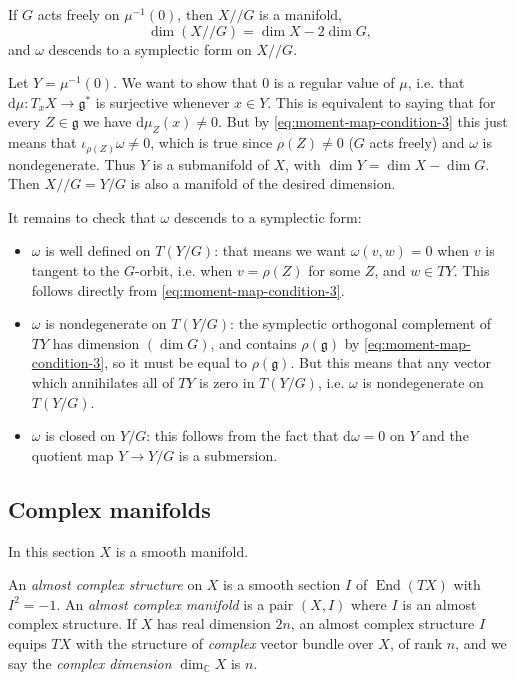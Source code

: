 \documentclass[12pt,letterpaper,reqno]{article}
\numberwithin{equation}{section}
\newcommand{\fg}{{\mathfrak g}}
\newcommand{\C}{\ensuremath{\mathbb C}}
\newcommand{\kq}{/\!\!/}
\newcommand{\de}{\mathrm{d}}
\newcommand{\ti}[1]{\textit{#1}}
\DeclareMathOperator{\End}{End}
\begin{document}
\begin{prop}
If $G$ acts freely
on $\mu^{-1}(0)$, then $X \kq G$ is a manifold,
\begin{equation}
  \dim (X \kq G) = \dim X - 2 \dim G,
\end{equation}
and $\omega$ descends to a symplectic form on $X \kq G$.
\end{prop}
\begin{pf}
Let $Y = \mu^{-1}(0)$.
We want to show that $0$ is a regular value of $\mu$,
i.e. that $\de \mu: T_x X \to \fg^*$ is surjective
whenever $x \in Y$. This 
is equivalent to saying that for every $Z \in \fg$
we have $\de \mu_Z(x) \neq 0$.
But by \eqref{eq:moment-map-condition-3} this just means
that $\iota_{\rho(Z)} \omega \neq 0$,
which is true since $\rho(Z) \neq 0$ ($G$ acts freely)
and $\omega$ is nondegenerate.
Thus $Y$ is a submanifold of $X$,
with $\dim Y = \dim X - \dim G$.
Then $X \kq G = Y / G$ is also a manifold of the desired 
dimension.

It remains to check that $\omega$ descends to a
symplectic form: 
\begin{itemize} 
\item $\omega$ is well defined
on $T(Y/G)$: that means we want $\omega(v,w) = 0$
when $v$ is tangent to the $G$-orbit, i.e. when $v = \rho(Z)$
for some $Z$, and $w \in TY$. This follows directly from
\eqref{eq:moment-map-condition-3}.
\item $\omega$ is nondegenerate on $T(Y/G)$:
the symplectic orthogonal complement of $TY$ has dimension
$(\dim G)$, and contains $\rho(\fg)$ by
\eqref{eq:moment-map-condition-3}, so it must be equal
to $\rho(\fg)$. But this means that any vector which
annihilates all of $TY$ is zero in $T(Y/G)$, i.e.
$\omega$ is nondegenerate on $T(Y/G)$.
\item $\omega$ is closed on $Y/G$: this follows 
from the fact that $\de \omega = 0$ on $Y$ and the
quotient map $Y \to Y/G$ is a submersion.
\end{itemize}
\end{pf}


\subsection{Complex manifolds} 
In this section $X$ is a smooth manifold.

\begin{defn}
An \ti{almost complex structure} on $X$ is a smooth section $I$ of $\End(TX)$ with $I^2 = -1$. An \ti{almost complex manifold} is a pair $(X,I)$ where $I$ is an almost complex structure.
If $X$ has real dimension $2n$, an almost complex
structure $I$ equips $TX$ with the structure of
\ti{complex} vector bundle over $X$, of rank $n$,
and we say the \ti{complex dimension} $\dim_\C X$ is
$n$.
\end{defn}
\end{document}
